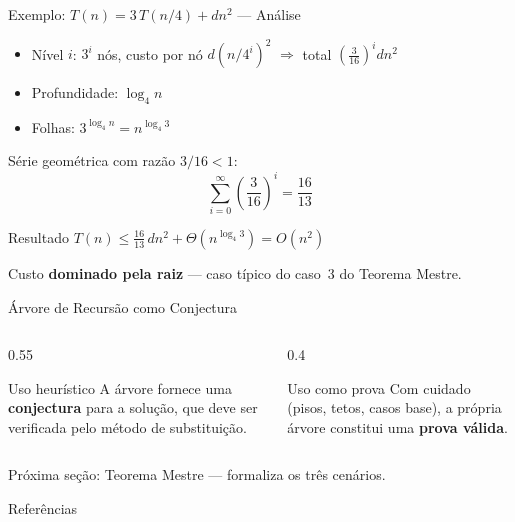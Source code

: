 \documentclass[aspectratio=169]{beamer}
\newcommand{\impt}[1]{\textcolor{maccent}{\textbf{#1}}}
\newcommand{\ntc}[1]{\textcolor{mprimary}{#1}}
\begin{document}
\begin{frame}{Exemplo: $T(n) = 3\,T(n/4) + dn^2$ --- Análise}
\begin{itemize}
    \item Nível $i$: $3^i$ nós, custo por nó $d(n/4^i)^2$ $\Rightarrow$ total $\left(\frac{3}{16}\right)^i dn^2$
    \pause
    \item Profundidade: $\log_4 n$
    \item Folhas: $3^{\log_4 n} = n^{\log_4 3}$
\end{itemize}

\vspace{0.2cm}
\pause

Série geométrica com razão $3/16 < 1$:
\[
\sum_{i=0}^{\infty} \left(\frac{3}{16}\right)^i = \frac{16}{13}
\]

\pause

\begin{alertblock}{Resultado}
$T(n) \leq \frac{16}{13}\,dn^2 + \Theta(n^{\log_4 3}) = O(n^2)$

\vspace{0.1cm}
Custo \impt{dominado pela raiz} --- caso típico do caso~3 do Teorema Mestre.
\end{alertblock}
\end{frame}


\begin{frame}{Árvore de Recursão como Conjectura}
\begin{columns}[T]
\begin{column}{0.55\textwidth}
\begin{block}{Uso heurístico}
A árvore fornece uma \impt{conjectura} para a solução, que deve ser verificada pelo método de substituição.
\end{block}
\end{column}

\begin{column}{0.4\textwidth}
\begin{block}{Uso como prova}
Com cuidado (pisos, tetos, casos base), a própria árvore constitui uma \impt{prova válida}.
\end{block}
\end{column}
\end{columns}

\vspace{0.5cm}

\begin{center}
\ntc{Próxima seção: Teorema Mestre --- formaliza os três cenários.}
\end{center}
\end{frame}


\begin{frame}[allowframebreaks]{Referências}
  
  
\end{frame}
\end{document}
